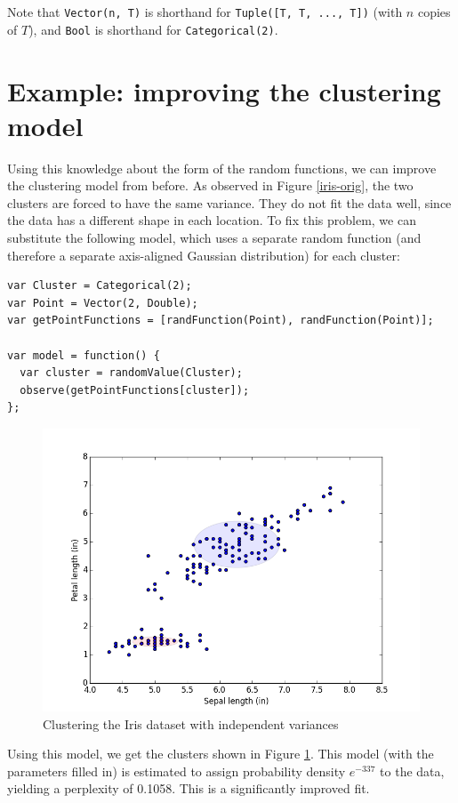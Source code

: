 \documentclass{article}
\begin{document}
  Note that \texttt{Vector(n, T)} is shorthand for \texttt{Tuple([T, T, ..., T])} (with $n$ copies of $T$),
  and \texttt{Bool} is shorthand for \texttt{Categorical(2)}.

  \section{Example: improving the clustering model}
  Using this knowledge about the form of the random functions, we can improve the clustering model from before.
  As observed in Figure \ref{iris-orig}, the two clusters are forced to have the
  same variance. They do not fit the data well, since the data has a different
  shape in each location.  To fix this problem, we can substitute the following
  model, which uses a separate random function (and therefore a separate axis-aligned Gaussian distribution) for each cluster:
  \begin{lstlisting}
var Cluster = Categorical(2);
var Point = Vector(2, Double);
var getPointFunctions = [randFunction(Point), randFunction(Point)];

var model = function() {
  var cluster = randomValue(Cluster);
  observe(getPointFunctions[cluster]);
};
\end{lstlisting}
  \begin{figure}[h]
  \begin{center}
    \includegraphics[scale=0.5]{../plots/irisclusters_indep.png}
  \end{center}
  \caption{Clustering the Iris dataset with independent variances}
  \label{iris-indep}
\end{figure}
Using this model, we get the clusters shown in Figure \ref{iris-indep}.
  This model (with the parameters filled in) is estimated to assign probability density $e^{-337}$ to the data, yielding a perplexity of 0.1058.  This is a significantly improved fit.
\end{document}
